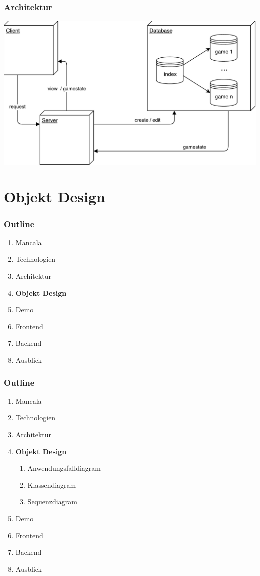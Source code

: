 \documentclass[
	10pt,
	t		%
]{beamer}
\begin{document}
\begin{frame}
\frametitle{Architektur}
\begin{center}
\includegraphics[scale=0.4]{./../Diagrams/Architecture.pdf}
\end{center}
\end{frame}

\section{Objekt Design}
\begin{frame}
\frametitle{Outline}
\begin{enumerate}
\item Mancala
\item Technologien
\item Architektur
\item \textbf{Objekt Design}
\item Demo
\item Frontend
\item Backend
\item Ausblick
\end{enumerate}
\end{frame}

\begin{frame}
\frametitle{Outline}
\begin{enumerate}
\item Mancala
\item Technologien
\item Architektur
\item \textbf{Objekt Design}
\begin{enumerate}
\item Anwendungsfalldiagram
\item Klassendiagram
\item Sequenzdiagram
\end{enumerate}
\item Demo
\item Frontend
\item Backend
\item Ausblick
\end{enumerate}
\end{frame}
\end{document}
